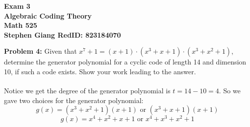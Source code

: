\documentclass[11pt]{article}
\newcommand{\skipline}{\vspace{\baselineskip}}
\newenvironment{problem}[1]{\textbf{Problem #1: }}{\newpage}
\begin{document}
	
	\begin{center}
		\textbf{Exam 3} \\
		\textbf{Algebraic Coding Theory} \\
		\textbf{Math 525} \\
		\textbf{Stephen Giang RedID: 823184070} \\
		\skipline \skipline
	\end{center}

	\begin{problem}{4}
		Given that $x^7+1 = (x+1)\cdot (x^3+x+1)\cdot (x^3+x^2+1)$, determine the generator polynomial for a cyclic code of length 14 and dimension 10, if such a code exists. Show your work leading to the answer.
		\\ \\
		Notice we get the degree of the generator polynomial is $t = 14 - 10 = 4$.  So we gave two choices for the generator polynomial:
		\[g(x) = (x^3+x^2+1)(x+1) \text{ or } (x^3+x+1)(x+1) \]
		\[g(x) = {x}^{4}+{x}^{2}+x+1 \text{ or } {x}^{4}+{x}^{3}+{x}^{2}+1\]
	\end{problem}
\end{document}
